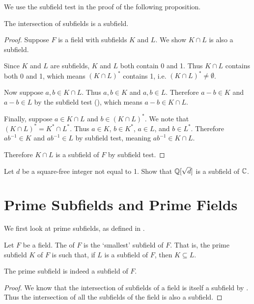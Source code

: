 We use the subfield test in the proof of the following proposition.

\begin{proposition}\label{prop-intersection-of-subfields-is-subfield}
    The intersection of subfields is a subfield.
\end{proposition}
\begin{proof}
    Suppose $F$ is a field with subfields $K$ and $L$. We show $K \cap L$ is also a subfield.

    Since $K$ and $L$ are subfields, $K$ and $L$ both contain 0 and 1. Thus $K \cap L$ contains both 0 and 1, which means $(K \cap L)^\ast$ contains 1, i.e. $(K\cap L)^\ast \neq \emptyset$.

    Now suppose $a, b \in K \cap L$. Thus $a, b \in K$ and $a, b \in L$. Therefore $a - b \in K$ and $a - b \in L$ by the subfield test (), which means $a - b \in K \cap L$.

    Finally, suppose $a \in K \cap L$ and $b \in (K \cap L)^\ast$. We note that $(K \cap L)^\ast = K^\ast \cap L^\ast$. Thus $a \in K$, $b \in K^\ast$, $a \in L$, and $b \in L^\ast$. Therefore $ab^{-1} \in K$ and $ab^{-1} \in L$ by subfield test, meaning $ab^{-1} \in K \cap L$.

    Therefore $K \cap L$ is a subfield of $F$ by subfield test.
\end{proof}

\begin{exercise}
    Let $d$ be a square-free integer not equal to 1. Show that $\mathbb{Q}[\sqrt{d}]$ is a subfield of $\mathbb{C}$.
\end{exercise}

\section{Prime Subfields and Prime Fields}
We first look at prime subfields, as defined in \cite[p.~268]{gallian_2016}.

\begin{definition}\label{definition-prime-subfield}
    Let $F$ be a field. The  of $F$ is the `smallest' subfield of $F$. That is, the prime subfield $K$ of $F$ is such that, if $L$ is a subfield of $F$, then $K \subseteq L$.
\end{definition}
\begin{proposition}
    The prime subfield is indeed a subfield of $F$.
\end{proposition}
\begin{proof}
    We know that the intersection of subfields of a field is itself a subfield by . Thus the intersection of all the subfields of the field is also a subfield.
\end{proof}

